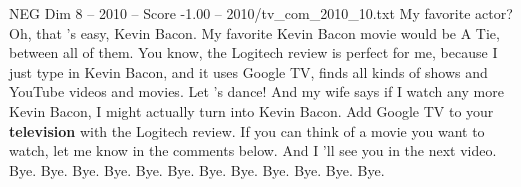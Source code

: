 \begin{textsample}{NEG Dim 8 – 2010 – Score -1.00 – 2010/tv\_com\_2010\_10.txt}  \label{ex:f8_neg_046}
My favorite actor?
Oh, that 's easy, Kevin Bacon.
My favorite Kevin Bacon movie would be A Tie, between all of them.
You know, the Logitech review is perfect for me, because I just type in Kevin Bacon, and it uses Google TV, finds all kinds of shows and YouTube videos and movies.
Let 's dance!
And my wife says if I watch any more Kevin Bacon, I might actually turn into Kevin Bacon.
Add Google TV to your \textbf{television} with the Logitech review.
If you can think of a movie you want to watch, let me know in the comments below.
And I 'll see you in the next video.
Bye.
Bye.
Bye.
Bye.
Bye.
Bye.
Bye.
Bye.
Bye.
Bye.
Bye.
Bye.

\end{textsample}

